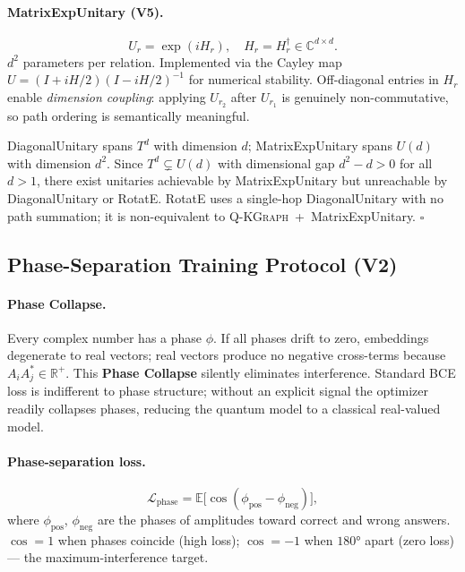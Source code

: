 \documentclass[runningheads]{llncs}
\newcommand{\QR}{\textsc{Q-KGraph}}
\newcommand{\CC}{\mathbb{C}}
\newcommand{\RR}{\mathbb{R}}
\newcommand{\Ud}{U(d)}
\newcommand{\Td}{T^d}
\newcommand{\dagop}{^\dagger}
\begin{document}
\paragraph{MatrixExpUnitary (V5).}
\begin{equation}
  U_r=\exp(i H_r),\quad H_r=H_r\dagop\in\CC^{d\times d}.
  \label{eq:meu}
\end{equation}
$d^2$ parameters per relation.  Implemented via the Cayley map
$U=(I+iH/2)(I-iH/2)^{-1}$ for numerical stability.  Off-diagonal entries
in $H_r$ enable \emph{dimension coupling}: applying $U_{r_2}$ after $U_{r_1}$
is genuinely non-commutative, so path ordering is semantically meaningful.

\begin{theorem}
\label{thm:v53}
DiagonalUnitary spans $\Td$ with dimension $d$; MatrixExpUnitary spans $\Ud$
with dimension $d^2$.  Since $\Td\subsetneq\Ud$ with dimensional gap
$d^2-d>0$ for all $d>1$, there exist unitaries achievable by MatrixExpUnitary
but unreachable by DiagonalUnitary or RotatE.  RotatE uses a single-hop
DiagonalUnitary with no path summation; it is non-equivalent to
\QR{}~+~MatrixExpUnitary. \hfill$\square$
\end{theorem}

\subsection{Phase-Separation Training Protocol (V2)}
\label{sec:training}

\paragraph{Phase Collapse.}
Every complex number has a phase $\phi$.  If all phases drift to zero,
embeddings degenerate to real vectors; real vectors produce no negative
cross-terms because $A_iA_j^*\in\RR^+$.  This \textbf{Phase Collapse}
silently eliminates interference.  Standard BCE loss is indifferent to phase
structure; without an explicit signal the optimizer readily collapses phases,
reducing the quantum model to a classical real-valued model.

\paragraph{Phase-separation loss.}
\begin{equation}
  \mathcal{L}_\text{phase}
  = \mathbb{E}\bigl[\cos(\phi_\text{pos}-\phi_\text{neg})\bigr],
  \label{eq:lphase}
\end{equation}
where $\phi_\text{pos}$, $\phi_\text{neg}$ are the phases of amplitudes
toward correct and wrong answers.  $\cos=1$ when phases coincide (high loss);
$\cos=-1$ when $180°$ apart (zero loss) --- the maximum-interference target.
\end{document}
